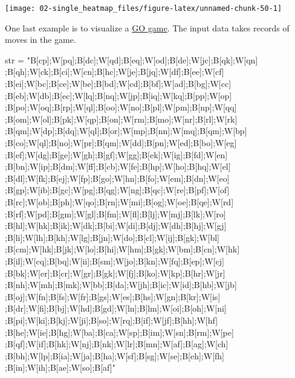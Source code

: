 \documentclass[]{book}
\newenvironment{Shaded}{\begin{snugshade}}{\end{snugshade}}
\newcommand{\StringTok}[1]{\textcolor[rgb]{0.31,0.60,0.02}{#1}}
\newcommand{\NormalTok}[1]{#1}
\theoremstyle{definition}
\theoremstyle{definition}
\theoremstyle{definition}
\theoremstyle{remark}
\begin{document}
\begin{center}\texttt{[image: 02-single\_heatmap\_files/figure-latex/unnamed-chunk-50-1]} \end{center}

One last example is to visualize a
\href{https://en.wikipedia.org/wiki/Go_\%28game\%29}{GO game}. The input
data takes records of moves in the game.

\begin{Shaded}
\begin{Highlighting}[]
\NormalTok{str =}\StringTok{ "B[cp];W[pq];B[dc];W[qd];B[eq];W[od];B[de];W[jc];B[qk];W[qn]}
\StringTok{;B[qh];W[ck];B[ci];W[cn];B[hc];W[je];B[jq];W[df];B[ee];W[cf]}
\StringTok{;B[ei];W[bc];B[ce];W[be];B[bd];W[cd];B[bf];W[ad];B[bg];W[cc]}
\StringTok{;B[eb];W[db];B[ec];W[lq];B[nq];W[jp];B[iq];W[kq];B[pp];W[op]}
\StringTok{;B[po];W[oq];B[rp];W[ql];B[oo];W[no];B[pl];W[pm];B[np];W[qq]}
\StringTok{;B[om];W[ol];B[pk];W[qp];B[on];W[rm];B[mo];W[nr];B[rl];W[rk]}
\StringTok{;B[qm];W[dp];B[dq];W[ql];B[or];W[mp];B[nn];W[mq];B[qm];W[bp]}
\StringTok{;B[co];W[ql];B[no];W[pr];B[qm];W[dd];B[pn];W[ed];B[bo];W[eg]}
\StringTok{;B[ef];W[dg];B[ge];W[gh];B[gf];W[gg];B[ek];W[ig];B[fd];W[en]}
\StringTok{;B[bn];W[ip];B[dm];W[ff];B[cb];W[fe];B[hp];W[ho];B[hq];W[el]}
\StringTok{;B[dl];W[fk];B[ej];W[fp];B[go];W[hn];B[fo];W[em];B[dn];W[eo]}
\StringTok{;B[gp];W[ib];B[gc];W[pg];B[qg];W[ng];B[qc];W[re];B[pf];W[of]}
\StringTok{;B[rc];W[ob];B[ph];W[qo];B[rn];W[mi];B[og];W[oe];B[qe];W[rd]}
\StringTok{;B[rf];W[pd];B[gm];W[gl];B[fm];W[fl];B[lj];W[mj];B[lk];W[ro]}
\StringTok{;B[hl];W[hk];B[ik];W[dk];B[bi];W[di];B[dj];W[dh];B[hj];W[gj]}
\StringTok{;B[li];W[lh];B[kh];W[lg];B[jn];W[do];B[cl];W[ij];B[gk];W[bl]}
\StringTok{;B[cm];W[hk];B[jk];W[lo];B[hi];W[hm];B[gk];W[bm];B[cn];W[hk]}
\StringTok{;B[il];W[cq];B[bq];W[ii];B[sm];W[jo];B[kn];W[fq];B[ep];W[cj]}
\StringTok{;B[bk];W[er];B[cr];W[gr];B[gk];W[fj];B[ko];W[kp];B[hr];W[jr]}
\StringTok{;B[nh];W[mh];B[mk];W[bb];B[da];W[jh];B[ic];W[id];B[hb];W[jb]}
\StringTok{;B[oj];W[fn];B[fs];W[fr];B[gs];W[es];B[hs];W[gn];B[kr];W[is]}
\StringTok{;B[dr];W[fi];B[bj];W[hd];B[gd];W[ln];B[lm];W[oi];B[oh];W[ni]}
\StringTok{;B[pi];W[ki];B[kj];W[ji];B[so];W[rq];B[if];W[jf];B[hh];W[hf]}
\StringTok{;B[he];W[ie];B[hg];W[ba];B[ca];W[sp];B[im];W[sn];B[rm];W[pe]}
\StringTok{;B[qf];W[if];B[hk];W[nj];B[nk];W[lr];B[mn];W[af];B[ag];W[ch]}
\StringTok{;B[bh];W[lp];B[ia];W[ja];B[ha];W[sf];B[sg];W[se];B[eh];W[fh]}
\StringTok{;B[in];W[ih];B[ae];W[so];B[af]"}
\end{Highlighting}
\end{Shaded}
\end{document}

